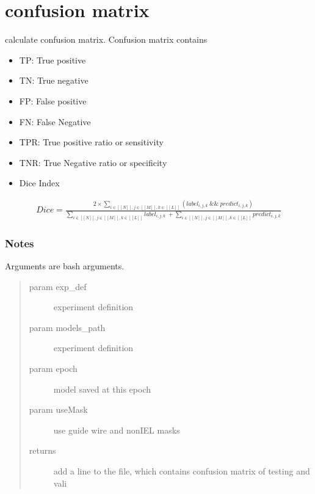 \documentclass[letterpaper,10pt,english]{sphinxmanual}
\begin{document}
\section{confusion matrix}
\label{\detokenize{index:module-util.confusion_matrix}}\label{\detokenize{index:confusion-matrix}}
calculate confusion matrix. Confusion matrix contains
\begin{itemize}
\item {} 
TP: True positive

\item {} 
TN: True negative

\item {} 
FP: False positive

\item {} 
FN: False Negative

\item {} 
TPR: True positive ratio or sensitivity

\item {} 
TNR: True Negative ratio or specificity

\item {} 
Dice Index

\end{itemize}
\begin{equation*}
\begin{split}Dice = \frac{
        2 \times \sum_{i \in [[N]],  j \in [[M]],  k \in [[L]]} (label_{i,j,k} \  \&\& \  predict_{i,j,k})
    }{
        \sum_{i \in [[N]],  j \in [[M]],  k \in [[L]]} label_{i,j,k} \ +              \sum_{i \in [[N]],  j \in [[M]],  k \in [[L]]} predict_{i,j,k}
    }\end{split}
\end{equation*}\subsubsection*{Notes}

Arguments are bash arguments.
\begin{quote}\begin{description}
\item[{param exp\_def}] \leavevmode
experiment definition

\item[{param models\_path}] \leavevmode
experiment definition

\item[{param epoch}] \leavevmode
model saved at this epoch

\item[{param useMask}] \leavevmode
use guide wire and nonIEL masks

\item[{returns}] \leavevmode
add a line to the  file, which contains confusion matrix of testing and vali

\end{description}\end{quote}
\end{document}
